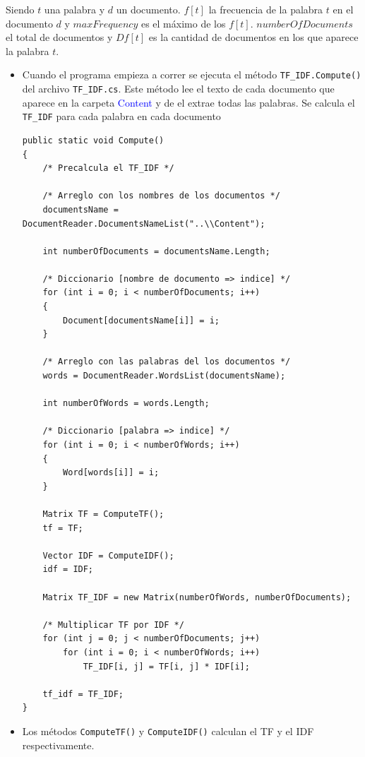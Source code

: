 \documentclass[12pt, a4paper]{article}
\renewcommand{\emph}{\textcolor{blue}}
\begin{document}
Siendo $t$ una palabra y $d$ un documento. $f[t]$ la frecuencia de la palabra $t$ en el documento $d$ 
y $maxFrequency$ es el máximo de los $f[t]$. $numberOfDocuments$ el total de documentos y 
$Df[t]$ es la cantidad de documentos en los que aparece la palabra $t$.

\begin{itemize}
    \item Cuando el programa empieza a correr se ejecuta el método \texttt{TF\_IDF.Compute()} del archivo
    \texttt{TF\_IDF.cs}. Este método lee el texto de cada documento que aparece en la carpeta \emph{Content} y de el
    extrae todas las palabras. Se calcula el \texttt{TF\_IDF} para cada palabra en cada documento

\begin{lstlisting}
public static void Compute()
{
    /* Precalcula el TF_IDF */
    
    /* Arreglo con los nombres de los documentos */
    documentsName = DocumentReader.DocumentsNameList("..\\Content");
    
    int numberOfDocuments = documentsName.Length;
   
    /* Diccionario [nombre de documento => indice] */
    for (int i = 0; i < numberOfDocuments; i++)
    {
        Document[documentsName[i]] = i;
    }
    
    /* Arreglo con las palabras del los documentos */
    words = DocumentReader.WordsList(documentsName);
    
    int numberOfWords = words.Length;
    
    /* Diccionario [palabra => indice] */
    for (int i = 0; i < numberOfWords; i++)
    {
        Word[words[i]] = i;
    }
    
    Matrix TF = ComputeTF();
    tf = TF;
    
    Vector IDF = ComputeIDF();
    idf = IDF;
    
    Matrix TF_IDF = new Matrix(numberOfWords, numberOfDocuments);
    
    /* Multiplicar TF por IDF */
    for (int j = 0; j < numberOfDocuments; j++)
        for (int i = 0; i < numberOfWords; i++)
            TF_IDF[i, j] = TF[i, j] * IDF[i];
    
    tf_idf = TF_IDF;
}
\end{lstlisting}

\item Los métodos \texttt{ComputeTF()} y \texttt{ComputeIDF()} calculan el TF y el IDF respectivamente.
\end{itemize}
\end{document}

